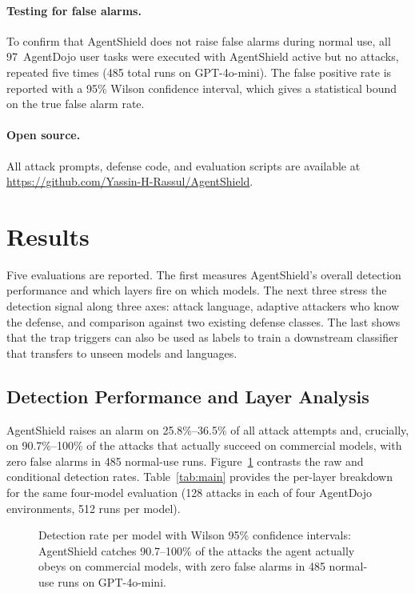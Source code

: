\documentclass[preprint,12pt]{elsarticle}
\begin{document}
\paragraph{Testing for false alarms.}
To confirm that AgentShield does not raise false alarms during normal use, all 97~AgentDojo user tasks were executed with AgentShield active but no attacks, repeated five times (485 total runs on GPT-4o-mini). The false positive rate is reported with a 95\% Wilson confidence interval, which gives a statistical bound on the true false alarm rate.

\paragraph{Open source.}
All attack prompts, defense code, and evaluation scripts are available at \url{https://github.com/Yassin-H-Rassul/AgentShield}.


\section{Results}
\label{sec:results}

Five evaluations are reported. The first measures AgentShield's overall detection performance and which layers fire on which models. The next three stress the detection signal along three axes: attack language, adaptive attackers who know the defense, and comparison against two existing defense classes. The last shows that the trap triggers can also be used as labels to train a downstream classifier that transfers to unseen models and languages.

\subsection{Detection Performance and Layer Analysis}
\label{sec:detection}

AgentShield raises an alarm on 25.8\%--36.5\% of all attack attempts and, crucially, on 90.7\%--100\% of the attacks that actually succeed on commercial models, with zero false alarms in 485 normal-use runs. Figure~\ref{fig:detection} contrasts the raw and conditional detection rates. Table~\ref{tab:main} provides the per-layer breakdown for the same four-model evaluation (128 attacks in each of four AgentDojo environments, 512 runs per model).

\begin{figure}[H]
\centering

\caption{Detection rate per model with Wilson 95\% confidence intervals: AgentShield catches 90.7--100\% of the attacks the agent actually obeys on commercial models, with zero false alarms in 485 normal-use runs on GPT-4o-mini.}
\label{fig:detection}
\end{figure}
\end{document}
